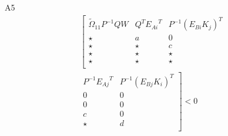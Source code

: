 \documentclass[a4paper]{article}
\begin{document}
\indent A5
\begin{multline} 
    \left[
    	\begin{array}{ccc}\tilde
    		{\Omega}_{11}P^{-1}QW
    		&Q^T{E_{Ai}}^T
    		&P^{-1}(E_{Bi}K_j)^T\\
    		\star&a&0\\
    		\star&\star&c\\
    		\star&\star&\star\\
    		\star&\star&\star\\
    	\end{array}
    	\right.\\
    	\left.
    	\begin{array}{cc}
    		P^{-1}{E_{Aj}}^T
    		&P^{-1}(E_{Bj}K_i)^T\\
    		0&0\\
    		0&0\\
    		c&0\\
    		\star&d\\
    	\end{array}
    \right]<0
\end{multline}
\end{document}
